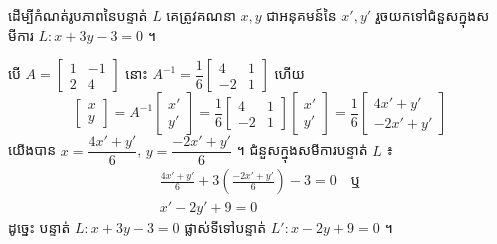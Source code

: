 \begin{center}
\end{center}

\begin{formulaBox}[ជាទូទៅ]
ដើម្បីកំណត់រូបភាពនៃបន្ទាត់ $L$ គេត្រូវគណនា $x, y$ ជាអនុគមន៍នៃ $x', y'$ រួចយកទៅជំនួសក្នុងសមីការ $L : x + 3y - 3 = 0$ ។
\end{formulaBox}

បើ $A = \begin{bmatrix} 1 & -1\\ 2 & 4 \end{bmatrix}$ នោះ $A^{-1} = \dfrac{1}{6}\begin{bmatrix} 4 & 1\\ -2 & 1 \end{bmatrix}$ ហើយ
\[ \begin{bmatrix} x\\ y \end{bmatrix} = A^{-1}\begin{bmatrix} x'\\ y' \end{bmatrix} = \frac{1}{6}\begin{bmatrix} 4 & 1\\ -2 & 1 \end{bmatrix}\begin{bmatrix} x'\\ y' \end{bmatrix} = \frac{1}{6}\begin{bmatrix} 4x' + y'\\ -2x' + y' \end{bmatrix} \]
យើងបាន $x = \dfrac{4x' + y'}{6}$, $y = \dfrac{-2x' + y'}{6}$ ។ ជំនួសក្នុងសមីការបន្ទាត់ $L$ ៖
\[
\begin{gathered}
\frac{4x' + y'}{6} + 3\left(\frac{-2x' + y'}{6}\right) - 3 = 0 \quad \text{ឬ}\\
x' - 2y' + 9 = 0
\end{gathered}
\]
ដូច្នេះ បន្ទាត់ $L : x + 3y - 3 = 0$ ផ្លាស់ទីទៅបន្ទាត់ $L' : x - 2y + 9 = 0$ ។

